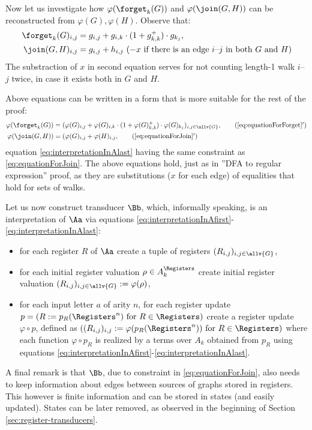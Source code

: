    Now let us investigate how $\varphi(\forget_k(G))$ and $\varphi(\join(G, H))$ can be reconstructed from $\varphi(G), \varphi(H)$.
    Observe that:
    \begin{align}\label{eq:equationForForget}
    	\forget_k(G)_{i,j} &= g_{i,j} + g_{i,k}\cdot(1 + g_{k,k}^+)\cdot g_{k_j},\\
    	\join(G, H)_{i,j} &= g_{i,j} + h_{i,j} \ (- x \text{ if there is an edge } i\text{--}j \text{ in both } G \text{ and } H)
    	\label{eq:equationForJoin}
    \end{align}
    The substraction of $x$ in second equation serves for not counting length-1 walk $i$--$j$ twice, in case it exists both in $G$ and $H$.
    
    Above equations can be written in a form that is more suitable for the rest of the proof:
    \begin{align}
    	\label{eq:interpretationInAfirst}%
   		\varphi(\forget_k(G)) &= (\varphi(G)_{i,j} + \varphi(G)_{i,k}\cdot(1 + \varphi(G)_{k,k}^+)\cdot \varphi(G)_{k_j})_{i,j \in \allv{G}}, \tag{\ref*{eq:equationForForget}${}^\prime$}\\
    	\varphi(\join(G, H)) &= (\varphi(G)_{i,j} + \varphi(H)_{i,j},
    	\label{eq:interpretationInAlast} \tag{\ref*{eq:equationForJoin}${}^\prime$}
    \end{align}
    equation \eqref{eq:interpretationInAlast} having the same constraint as \eqref{eq:equationForJoin}.
    The above equations hold, just as in ''DFA to regular expression'' proof, as they are substitutions ($x$ for each edge) of equalities that hold for sets of walks.
    
	Let us now construct transducer $\Bb$, which, informally speaking, is an interpretation of $\Aa$ via equations \eqref{eq:interpretationInAfirst}-\eqref{eq:interpretationInAlast}:
	\begin{itemize}
		\item for each register $R$ of $\Aa$ create a tuple of registers $(R_{i,j})_{i, j \in \allv{G}}$,
		\item for each initial register valuation $\rho \in A_k^{\Registers}$ create initial register valuation $(R_{i,j})_{i,j\in\allv{G}} := \varphi(\rho)$,
		\item for each input letter $a$ of arity $n$, for each register update $p = (R:= p_R(\Registers^n) \text{ for } R \in \Registers)$ create a register update $\varphi\circ p$, defined as $((R_{i,j})_{i,j} := \varphi(p_R(\Registers^n)) \text{ for } R\in\Registers)$ where each function $\varphi\circ p_R$ is realized by a terms over $A_k$ obtained from $p_R$ using equations \eqref{eq:interpretationInAfirst}-\eqref{eq:interpretationInAlast}.
	\end{itemize}
	A final remark is that $\Bb$, due to constraint in \eqref{eq:equationForJoin}, also needs to keep information about edges between sources of graphs stored in registers. This however is finite information and can be stored in states (and easily updated). States can be later removed, as observed in the beginning of Section \ref{sec:register-transducers}.